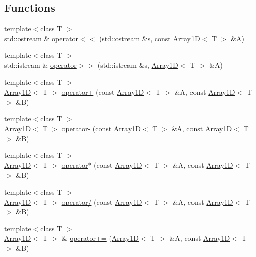 \subsection*{Functions}
\begin{DoxyCompactItemize}
\item 
{\footnotesize template$<$class T $>$ }\\std\-::ostream \& \hyperlink{namespaceTNT_ac0bffe1c89cc792a28f37d17afc2ce67}{operator$<$$<$} (std\-::ostream \&s, const \hyperlink{classTNT_1_1Array1D}{Array1\-D}$<$ T $>$ \&A)
\item 
{\footnotesize template$<$class T $>$ }\\std\-::istream \& \hyperlink{namespaceTNT_ac85e172cd409433504bb3a8a6df3ac9f}{operator$>$$>$} (std\-::istream \&s, \hyperlink{classTNT_1_1Array1D}{Array1\-D}$<$ T $>$ \&A)
\item 
{\footnotesize template$<$class T $>$ }\\\hyperlink{classTNT_1_1Array1D}{Array1\-D}$<$ T $>$ \hyperlink{namespaceTNT_a25681ebc742c0ffb1fc09d8988a7314c}{operator+} (const \hyperlink{classTNT_1_1Array1D}{Array1\-D}$<$ T $>$ \&A, const \hyperlink{classTNT_1_1Array1D}{Array1\-D}$<$ T $>$ \&B)
\item 
{\footnotesize template$<$class T $>$ }\\\hyperlink{classTNT_1_1Array1D}{Array1\-D}$<$ T $>$ \hyperlink{namespaceTNT_a79ec326e12f3292bf034035d52c98a08}{operator-\/} (const \hyperlink{classTNT_1_1Array1D}{Array1\-D}$<$ T $>$ \&A, const \hyperlink{classTNT_1_1Array1D}{Array1\-D}$<$ T $>$ \&B)
\item 
{\footnotesize template$<$class T $>$ }\\\hyperlink{classTNT_1_1Array1D}{Array1\-D}$<$ T $>$ \hyperlink{namespaceTNT_a631669334b75ebb846723bf079fd2c8d}{operator$\ast$} (const \hyperlink{classTNT_1_1Array1D}{Array1\-D}$<$ T $>$ \&A, const \hyperlink{classTNT_1_1Array1D}{Array1\-D}$<$ T $>$ \&B)
\item 
{\footnotesize template$<$class T $>$ }\\\hyperlink{classTNT_1_1Array1D}{Array1\-D}$<$ T $>$ \hyperlink{namespaceTNT_aba09c30731e80420cd42fff00f72b18b}{operator/} (const \hyperlink{classTNT_1_1Array1D}{Array1\-D}$<$ T $>$ \&A, const \hyperlink{classTNT_1_1Array1D}{Array1\-D}$<$ T $>$ \&B)
\item 
{\footnotesize template$<$class T $>$ }\\\hyperlink{classTNT_1_1Array1D}{Array1\-D}$<$ T $>$ \& \hyperlink{namespaceTNT_a7f7491e4135cc219739a541eead94bb5}{operator+=} (\hyperlink{classTNT_1_1Array1D}{Array1\-D}$<$ T $>$ \&A, const \hyperlink{classTNT_1_1Array1D}{Array1\-D}$<$ T $>$ \&B)

\end{DoxyCompactItemize}
